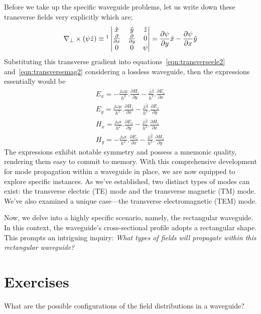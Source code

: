 Before we take up the specific waveguide problems, let us write down these transverse fields very explicitly which are;
\begin{dmath*}
\nabla_\bot\times(\psi\hat{z}) \equiv 
\footnotemark\begin{vmatrix}
\hat{x} & \hat{y} &\hat{z}\\
\partialderivative{}{x} & \partialderivative{}{y} & 0\\
0 & 0 & \psi
\end{vmatrix} = \frac{\partial\psi}{\partial y}\hat{x} - \frac{\partial\psi}{\partial x}\hat{y}
\end{dmath*}
Substituting this transverse gradient into equations~\eqref{eqn:transverseele2} and~\eqref{eqn:transversemag2} considering a lossless waveguide, then the expressions essentially would be
\begin{align}
E_x = -\frac{j\omega\mu}{h^2}.\frac{\partial H_z}{\partial y} - \frac{j\bar{\beta}}{h^2}.\frac{\partial E_z}{\partial x}
\label{eqn:transverseex}\\
E_y = \frac{j\omega\mu}{h^2}.\frac{\partial H_z}{\partial x} - \frac{j\bar{\beta}}{h^2}.\frac{\partial E_z}{\partial y}
\label{eqn:transverseey}\\
H_x = \frac{j\omega\epsilon}{h^2}.\frac{\partial E_z}{\partial y} - \frac{j\bar{\beta}}{h^2}.\frac{\partial H_z}{\partial x}
\label{eqn:transversehx}\\
H_y = -\frac{j\omega\epsilon}{h^2}.\frac{\partial E_z}{\partial x} - \frac{j\bar{\beta}}{h^2}.\frac{\partial H_z}{\partial y}
\label{eqn:transversehy}
\end{align}
The expressions exhibit notable symmetry and possess a mnemonic quality, rendering them easy to commit to memory. With this comprehensive development for mode propagation within a waveguide in place, we are now equipped to explore specific instances. As we've established, two distinct types of modes can exist: the transverse electric (TE) mode and the transverse magnetic (TM) mode. We've also examined a unique case—the transverse electromagnetic (TEM) mode. 

Now, we delve into a highly specific scenario, namely, the rectangular waveguide. In this context, the waveguide's cross-sectional profile adopts a rectangular shape. This prompts an intriguing inquiry: \emph{What types of fields will propagate within this rectangular waveguide?}

\section*{Exercises}
\begin{ExerciseList}
\Exercise[label={ex371}]
What are the possible configurations of the field distributions in a waveguide?
\end{ExerciseList}
